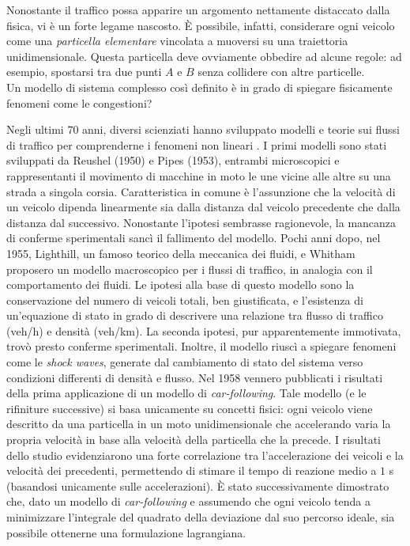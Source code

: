 Nonostante il traffico possa apparire un argomento nettamente distaccato dalla fisica, vi \`e un forte legame nascosto.
\`E possibile, infatti, considerare ogni veicolo come una \emph{particella elementare} vincolata a muoversi su una traiettoria unidimensionale.
Questa particella deve ovviamente obbedire ad alcune regole: ad esempio, spostarsi tra due punti $A$ e $B$ senza collidere con altre particelle.\\
Un modello di sistema complesso cos\`i definito \`e in grado di spiegare fisicamente fenomeni come le congestioni?

Negli ultimi 70 anni, diversi scienziati hanno sviluppato modelli e teorie sui flussi di traffico per comprenderne i fenomeni non lineari \cite{bs2004physics}.
I primi modelli sono stati sviluppati da Reushel (1950) e Pipes (1953), entrambi microscopici e rappresentanti il movimento di macchine in moto le une vicine alle altre su una strada a singola corsia.
Caratteristica in comune \`e l'assunzione che la velocit\`a di un veicolo dipenda linearmente sia dalla distanza dal veicolo precedente che dalla distanza dal successivo.
Nonostante l'ipotesi sembrasse ragionevole, la mancanza di conferme sperimentali sanc\`i il fallimento del modello.
Pochi anni dopo, nel 1955, Lighthill, un famoso teorico della meccanica dei fluidi, e Whitham proposero un modello macroscopico per i flussi di traffico, in analogia con il comportamento dei fluidi.
Le ipotesi alla base di questo modello sono la conservazione del numero di veicoli totali, ben giustificata, e l'esistenza di un'equazione di stato in grado di descrivere una relazione tra flusso di traffico (veh/h) e densit\`a (veh/km).
La seconda ipotesi, pur apparentemente immotivata, trov\`o presto conferme sperimentali.
Inoltre, il modello riusc\`i a spiegare fenomeni come le \emph{shock waves}, generate dal cambiamento di stato del sistema verso condizioni differenti di densit\`a e flusso.
Nel 1958 vennero pubblicati i risultati della prima applicazione di un modello di \emph{car-following}.
Tale modello (e le rifiniture successive) si basa unicamente su concetti fisici: ogni veicolo viene descritto da una particella in un moto unidimensionale che accelerando varia la propria velocit\`a in base alla velocit\`a della particella che la precede.
I risultati dello studio evidenziarono una forte correlazione tra l'accelerazione dei veicoli e la velocit\`a dei precedenti, permettendo di stimare il tempo di reazione medio a $1$ s (basandosi unicamente sulle accelerazioni).
\`E stato successivamente dimostrato che, dato un modello di \emph{car-following} e assumendo che ogni veicolo tenda a minimizzare l'integrale del quadrato della deviazione dal suo percorso ideale, sia possibile ottenerne una formulazione lagrangiana.

